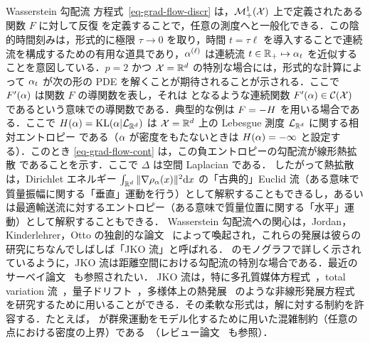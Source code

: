 \begin{rem2}{Wasserstein 勾配流}
方程式~\eqref{eq-grad-flow-discr} は，$\mathcal{M}_+^1(\mathcal{X})$ 上で定義されたある関数 $F$ に対して反復
を定義することで，任意の測度へと一般化できる．この陰的時間刻みは，形式的に極限 $\tau \rightarrow 0$ を取り，時間 $t=\tau \ell$ を導入することで連続流を構成するための有用な道具であり，$\alpha^{(\ell)}$ は連続流 $t \in \mathbb{R}_+ \mapsto \alpha_t$ を近似することを意図している．$p=2$ かつ $\mathcal{X}=\mathbb{R}^d$ の特別な場合には，形式的な計算によって $\alpha_t$ が次の形の PDE
を解くことが期待されることが示される．ここで $F'(\alpha)$ は関数 $F$ の導関数を表し，それは
となるような連続関数 $F'(\alpha) \in \mathcal{C}(\mathcal{X})$ であるという意味での導関数である．典型的な例は $F=-H$ を用いる場合である．ここで $H(\alpha)=\operatorname{KL}(\alpha|\mathcal{L}_{\mathbb{R}^d})$ は $\mathcal{X}=\mathbb{R}^d$ 上の Lebesgue 測度 $\mathcal{L}_{\mathbb{R}^d}$ に関する相対エントロピー
である（$\alpha$ が密度をもたないときは $H(\alpha)=-\infty$ と設定する）．このとき \eqref{eq-grad-flow-cont} は，この負エントロピーの勾配流が線形熱拡散
であることを示す．ここで $\Delta$ は空間 Laplacian である．
%
したがって熱拡散は，Dirichlet エネルギー $\int_{\mathbb{R}^d} \|\nabla \rho_{\alpha}(x)\|^2 \mathrm{d} x$ の「古典的」Euclid 流（ある意味で質量振幅に関する「垂直」運動を行う）として解釈することもできるし，あるいは最適輸送流に対するエントロピー（ある意味で質量位置に関する「水平」運動）として解釈することもできる．
%
Wasserstein 勾配流への関心は，Jordan，Kinderlehrer，Otto の独創的な論文~\citep{jordan1998variational} によって喚起され，これらの発展は彼らの研究にちなんでしばしば「JKO 流」と呼ばれる．\citet{ambrosio2006gradient} のモノグラフで詳しく示されているように，JKO 流は距離空間における勾配流の特別な場合である．最近のサーベイ論文~\citep{santambrogio2017euclidean} も参照されたい．
%
JKO 流は，特に多孔質媒体方程式~\citep{otto2001geometry}，total variation 流~\citep{carlier2017total}，量子ドリフト~\citep{GianazzaARMA}，多様体上の熱発展~\citep{ErbarHeatManifold} のような非線形発展方程式を研究するために用いることができる．その柔軟な形式は，解に対する制約を許容する．たとえば，\citeauthor{maury2010macroscopic} が群衆運動をモデル化するために用いた混雑制約（任意の点における密度の上界）である~\citep{maury2010macroscopic}（レビュー論文~\citep{SantambrogioCrowdReview} も参照）．
\end{rem2}


